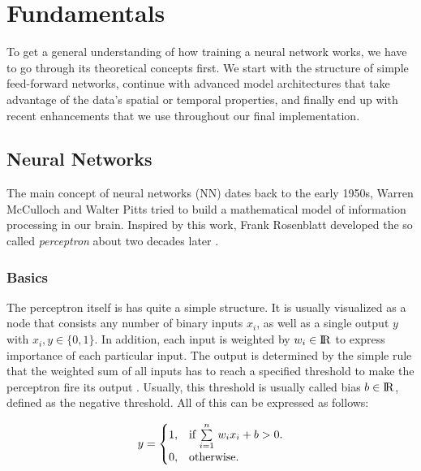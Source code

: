 
\chapter{Fundamentals} \label{chapter:fundamentals}

To get a general understanding of how training a neural network works, we have to go through its theoretical concepts first. We start with the structure of simple feed-forward networks, continue with advanced model architectures that take advantage of the data's spatial or temporal properties, and finally end up with recent enhancements that we use throughout our final implementation.


\section{Neural Networks}

The main concept of neural networks (NN) dates back to the early 1950s, Warren McCulloch and Walter Pitts tried to build a mathematical model of information processing in our brain. Inspired by this work, Frank Rosenblatt developed the so called \textit{perceptron} about two decades later \parencite[p. 226]{pattern_and_ml}. 

\subsection{Basics}

The perceptron itself is has quite a simple structure. It is usually visualized as a node that consists any number of binary inputs $ x_{i} $, as well as a single output $ y $ with $ x_{i}, y \in \{0, 1\} $. In addition, each input is weighted by $ w_{i} \in \rm I\!R $ to express importance of each particular input. The output is determined by the simple rule that the weighted sum of all inputs has to reach a specified threshold to make the perceptron fire its output \parencite{neural_nets_deep_learning}. Usually, this threshold is usually called bias $ b \in \rm I\!R $, defined as the negative threshold. All of this can be expressed as follows:

\begin{equation} \label{eq:mlp}
  y = \begin{cases}
    1, & \text{if $ \sum\limits_{i=1}^n \, w_{i}x_{i} + b > 0$}.\\
    0, & \text{otherwise}.
  \end{cases}
\end{equation}

